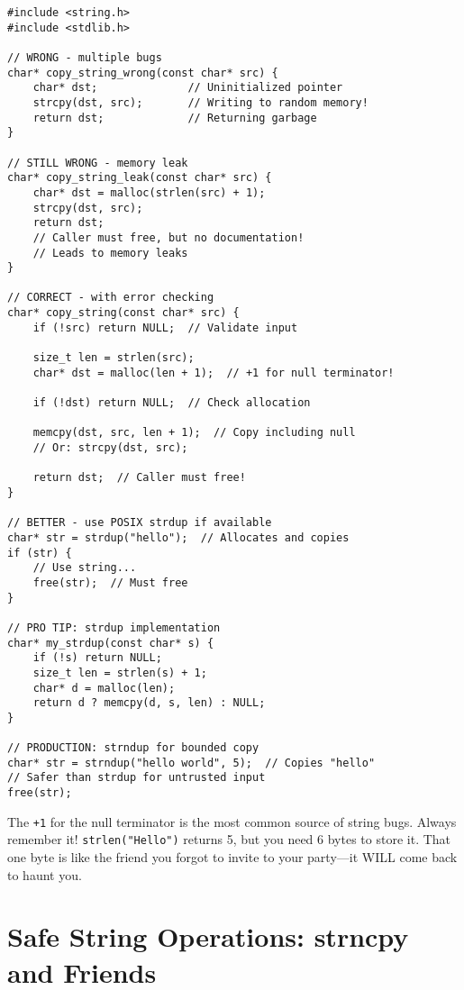 \begin{lstlisting}
#include <string.h>
#include <stdlib.h>

// WRONG - multiple bugs
char* copy_string_wrong(const char* src) {
    char* dst;              // Uninitialized pointer
    strcpy(dst, src);       // Writing to random memory!
    return dst;             // Returning garbage
}

// STILL WRONG - memory leak
char* copy_string_leak(const char* src) {
    char* dst = malloc(strlen(src) + 1);
    strcpy(dst, src);
    return dst;
    // Caller must free, but no documentation!
    // Leads to memory leaks
}

// CORRECT - with error checking
char* copy_string(const char* src) {
    if (!src) return NULL;  // Validate input

    size_t len = strlen(src);
    char* dst = malloc(len + 1);  // +1 for null terminator!

    if (!dst) return NULL;  // Check allocation

    memcpy(dst, src, len + 1);  // Copy including null
    // Or: strcpy(dst, src);

    return dst;  // Caller must free!
}

// BETTER - use POSIX strdup if available
char* str = strdup("hello");  // Allocates and copies
if (str) {
    // Use string...
    free(str);  // Must free
}

// PRO TIP: strdup implementation
char* my_strdup(const char* s) {
    if (!s) return NULL;
    size_t len = strlen(s) + 1;
    char* d = malloc(len);
    return d ? memcpy(d, s, len) : NULL;
}

// PRODUCTION: strndup for bounded copy
char* str = strndup("hello world", 5);  // Copies "hello"
// Safer than strdup for untrusted input
free(str);
\end{lstlisting}

\begin{notebox}
The \texttt{+1} for the null terminator is the most common source of string bugs. Always remember it! \texttt{strlen("Hello")} returns 5, but you need 6 bytes to store it. That one byte is like the friend you forgot to invite to your party---it WILL come back to haunt you.
\end{notebox}

\section{Safe String Operations: strncpy and Friends}

